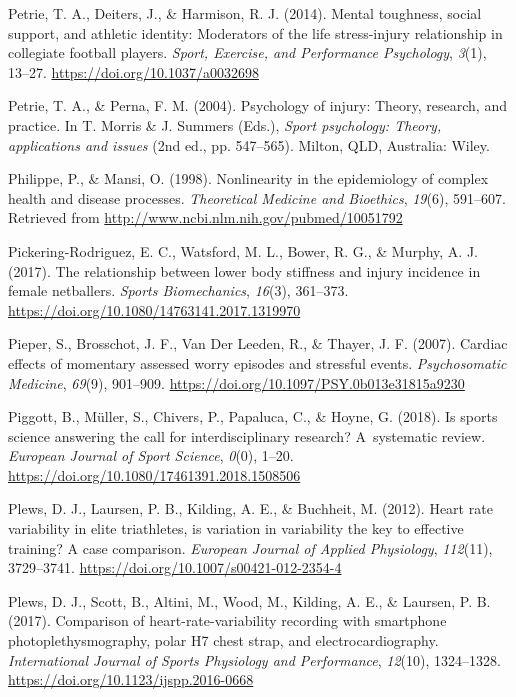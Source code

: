 \documentclass[
  english,
  man,floatsintext]{apa6}
\begin{document}
\leavevmode\hypertarget{ref-Petrie2014}{}%
Petrie, T. A., Deiters, J., \& Harmison, R. J. (2014). Mental toughness, social support, and athletic identity: Moderators of the life stress-injury relationship in collegiate football players. \emph{Sport, Exercise, and Performance Psychology}, \emph{3}(1), 13--27. \url{https://doi.org/10.1037/a0032698}

\leavevmode\hypertarget{ref-Perna2004}{}%
Petrie, T. A., \& Perna, F. M. (2004). Psychology of injury: Theory, research, and practice. In T. Morris \& J. Summers (Eds.), \emph{Sport psychology: Theory, applications and issues} (2nd ed., pp. 547--565). Milton, QLD, Australia: Wiley.

\leavevmode\hypertarget{ref-Philippe1998}{}%
Philippe, P., \& Mansi, O. (1998). Nonlinearity in the epidemiology of complex health and disease processes. \emph{Theoretical Medicine and Bioethics}, \emph{19}(6), 591--607. Retrieved from \url{http://www.ncbi.nlm.nih.gov/pubmed/10051792}

\leavevmode\hypertarget{ref-PickeringRodriguez2017}{}%
Pickering-Rodriguez, E. C., Watsford, M. L., Bower, R. G., \& Murphy, A. J. (2017). The relationship between lower body stiffness and injury incidence in female netballers. \emph{Sports Biomechanics}, \emph{16}(3), 361--373. \url{https://doi.org/10.1080/14763141.2017.1319970}

\leavevmode\hypertarget{ref-Pieper2007}{}%
Pieper, S., Brosschot, J. F., Van Der Leeden, R., \& Thayer, J. F. (2007). Cardiac effects of momentary assessed worry episodes and stressful events. \emph{Psychosomatic Medicine}, \emph{69}(9), 901--909. \url{https://doi.org/10.1097/PSY.0b013e31815a9230}

\leavevmode\hypertarget{ref-Piggott2018}{}%
Piggott, B., Müller, S., Chivers, P., Papaluca, C., \& Hoyne, G. (2018). Is sports science answering the call for interdisciplinary research? A~systematic review. \emph{European Journal of Sport Science}, \emph{0}(0), 1--20. \url{https://doi.org/10.1080/17461391.2018.1508506}

\leavevmode\hypertarget{ref-Plews2012}{}%
Plews, D. J., Laursen, P. B., Kilding, A. E., \& Buchheit, M. (2012). Heart rate variability in elite triathletes, is variation in variability the key to effective training? A case comparison. \emph{European Journal of Applied Physiology}, \emph{112}(11), 3729--3741. \url{https://doi.org/10.1007/s00421-012-2354-4}

\leavevmode\hypertarget{ref-Plews2017}{}%
Plews, D. J., Scott, B., Altini, M., Wood, M., Kilding, A. E., \& Laursen, P. B. (2017). Comparison of heart-rate-variability recording with smartphone photoplethysmography, polar H7 chest strap, and electrocardiography. \emph{International Journal of Sports Physiology and Performance}, \emph{12}(10), 1324--1328. \url{https://doi.org/10.1123/ijspp.2016-0668}
\end{document}
